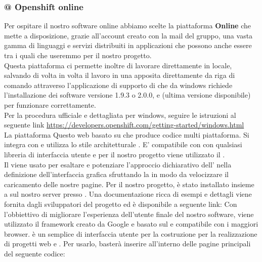 \documentclass[a4paper,11pt]{article}
\begin{document}
			\subsubsection{@ Openshift online} \label{s:openshift}
			Per ospitare il nostro software online abbiamo scelte la piattaforma \textbf{ Online } che mette a disposizione, grazie all'account creato con la mail del gruppo, una vasta gamma di linguaggi e servizi distribuiti in applicazioni che possono anche essere  tra i quali  che useremmo per il nostro progetto.\\
			Questa piattaforma ci permette inoltre di lavorare direttamente in locale, salvando di volta in volta il lavoro in una apposita  direttamente da riga di comando attraverso l'applicazione di supporto di   che da windows richiede l'installazione dei software  versione 1.9.3 o 2.0.0,   e (ultima versione disponibile)  per funzionare correttamente.\\
			Per la procedura ufficiale e dettagliata per windows, seguire le istruzioni al seguente link \url{https://developers.openshift.com/getting-started/windows.html} \\
			
			
			 \label{s:meteor}
			La piattaforma  Questo  web basato su  che produce codice  multi piattaforma. Si integra con  e utilizza lo stile architetturale . E' compatibile con con qualsiasi libreria  di interfaccia utente e per il nostro progetto viene utilizzato il  .\\
			
			\label{s:angular}
			Il   viene usato per esaltare e potenziare l'approccio dichiarativo dell' nella definizione dell'interfaccia grafica sfruttando la  in modo da velocizzare il caricamento delle nostre pagine. Per il nostro progetto,  è stato installato insieme a  sul nostro server presso . Una documentazione ricca di esempi e dettagli viene fornita dagli sviluppatori del progetto ed è disponibile a seguente link: \url{}
			Con l'obbiettivo di migliorare l'esperienza dell'utente finale del nostro software, viene utilizzato il framework  creato da Google e basato sul  e compatibile con i maggiori browser.  è un semplice  di interfaccia utente  per la costruzione per la realizzazione di progetti web  e . Per usarlo, basterà inserire all'interno delle pagine  principali del seguente codice: \\
			\\
			
\end{document}
